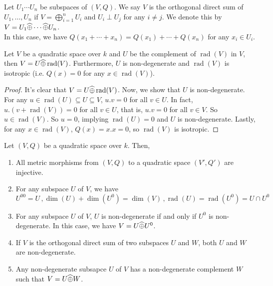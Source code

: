 \documentclass[15pt]{scrartcl}
\newcommand{\rad}{\operatorname{rad}}
\newcommand{\po}{\wh{\oplus}}
\begin{document}
\begin{definition}
    Let $U_1\cdots U_n$ be subspaces of $(V,Q)$. We say $V$ is the orthogonal direct sum of $U_1,\ldots,U_n$ if $V=\bigoplus_{i=1}^n U_i$ and $U_i\perp U_j$ for any $i\neq j$. We denote this by $V=U_1\po \cdots \po U_n$.
    \\

    In this case, we have $Q(x_1+\cdots +x_n)=Q(x_1)+\cdots +Q(x_n)$ for any $x_i\in U_i$.
\end{definition}
\begin{theorem}
    Let $V$ be a quadratic space over $k$ and $U$ be the complement of $\rad(V)$ in $V$, then $V=U\po\rad(V)$. Furthermore, $U$ is non-degenerate and $\rad(V)$ is isotropic (i.e. $Q(x)=0$ for any $x\in \rad(V)$).
\end{theorem}
\begin{proof}
    It's clear that $V=U\po\rad(V)$. Now, we show that $U$ is non-degenerate. For any $u\in \rad(U)\subseteq U\subseteq V$, $u.v=0$ for all $v\in U$. In fact, $u.(v+\rad(V))=0$ for all $v\in U$, that is, $u.v=0$ for all $v\in V$. So $u\in \rad(V)$. So $u=0$, implying $\rad(U)=0$ and $U$ is non-degenerate. Lastly, for any $x\in \rad(V)$, $Q(x)=x.x=0$, so $\rad(V)$ is isotropic.
\end{proof}
\begin{proposition}
    Let $(V,Q)$ be a quadratic space over $k$. Then, 
    \begin{enumerate}
        \item All metric morphisms from $(V,Q)$ to a quadratic space $(V',Q')$ are injective.
        \item For any subspace $U$ of $V$, we have 
        \[U^{00}=U\,, \dim(U)+\dim(U^0)=\dim(V)\,,\rad(U)=\rad(U^0)=U\cap U^0\]
        \item For any subspace $U$ of $V$, $U$ is non-degenerate if and only if $U^0$ is non-degenerate. In this case, we have $V=U\po U^0$.
        \item If $V$ is the orthogonal direct sum of two subspaces $U$ and $W$, both $U$ and $W$ are non-degenerate. 
        \item Any non-degenerate subsapce $U$ of $V$ has a non-degenerate complement $W$ such that $V=U\po W$.
    \end{enumerate}
\end{proposition}
\end{document}
